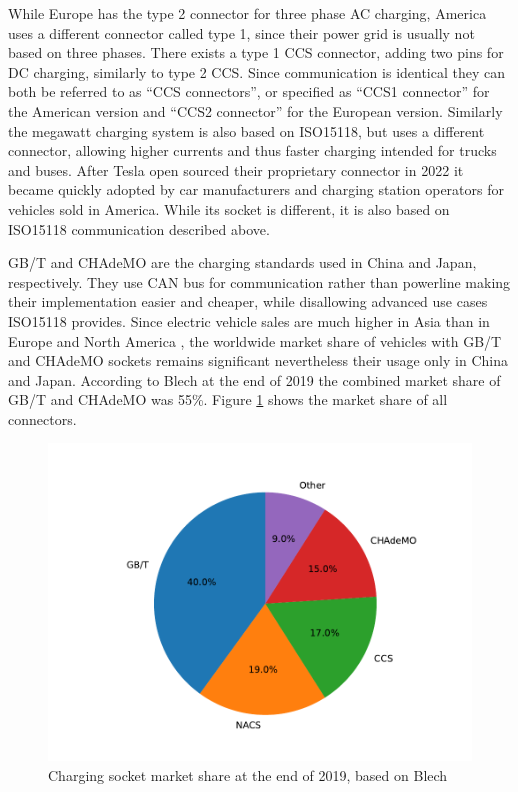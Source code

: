 \documentclass[conference,flushend]{iaria} %
\begin{document}
While Europe has the type 2 connector for three phase AC charging, America uses a different connector called type 1, since their power grid is usually not based on three phases.
There exists a type 1 CCS connector, adding two pins for DC charging, similarly to type 2 CCS.
Since communication is identical they can both be referred to as \enquote{CCS connectors}, or specified as \enquote{CCS1 connector} for the American version and \enquote{CCS2 connector} for the European version.
Similarly the megawatt charging system is also based on ISO15118, but uses a different connector, allowing higher currents and thus faster charging intended for trucks and buses.
After Tesla open sourced their proprietary connector in 2022 \cite{noauthor_opening_nodate} it became quickly adopted by car manufacturers and charging station operators for vehicles sold in America.
While its socket is different, it is also based on ISO15118 communication described above.

GB/T and CHAdeMO are the charging standards used in China and Japan, respectively.
They use CAN bus for communication rather than powerline making their implementation easier and cheaper, while disallowing advanced use cases ISO15118 provides.
Since electric vehicle sales are much higher in Asia than in Europe and North America \cite{noauthor_trends_nodate}, the worldwide market share of vehicles with GB/T and CHAdeMO sockets remains significant nevertheless their usage only in China and Japan.
According to Blech \cite{blech_project_nodate} at the end of 2019 the combined market share of GB/T and CHAdeMO was 55\%. Figure \ref{fig:connector_marketshare} shows the market share of all connectors.

\begin{figure}[ht]
    \centering
    \includegraphics[width=.489\textwidth]{graphs/worldwide_plugs.pdf}
    \caption{Charging socket market share at the end of 2019, based on Blech \cite{blech_project_nodate}}
    \label{fig:connector_marketshare}
\end{figure}
\end{document}

